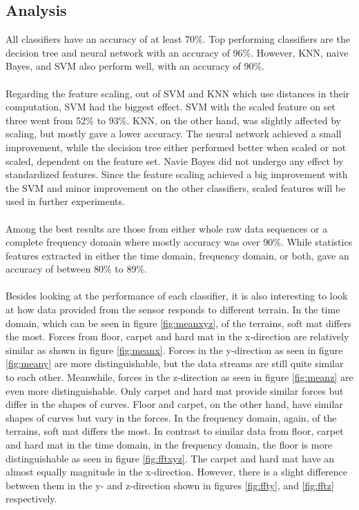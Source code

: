\documentclass[USenglish]{ifimaster}  %
\begin{document}
\subsection{Analysis}
All classifiers have an accuracy of at least 70\%. Top performing classifiers are the decision tree and neural network with an accuracy of 96\%. However, KNN, naive Bayes, and SVM also perform well, with an accuracy of 90\%. 
\\
\\
Regarding the feature scaling, out of SVM and KNN which use distances in their computation, SVM had the biggest effect. SVM with the scaled feature on set three went from 52\% to 93\%. KNN, on the other hand, was slightly affected by scaling, but mostly gave a lower accuracy. The neural network achieved a small improvement, while the decision tree either performed better when scaled or not scaled, dependent on the feature set. Navie Bayes did not undergo any effect by standardized features. Since the feature scaling achieved a big improvement with the SVM and minor improvement on the other classifiers, scaled features will be used in further experiments.
\\
\\
Among the best results are those from either whole raw data sequences or a complete frequency domain where mostly accuracy was over 90\%. While statistics features extracted in either the time domain, frequency domain, or both, gave an accuracy of between 80\% to 89\%.
\\
\\
Besides looking at the performance of each classifier, it is also interesting to look at how data provided from the sensor responds to different terrain. In the time domain, which can be seen in figure \ref{fig:meanxyz}, of the terrains, soft mat differs the most. Forces from floor, carpet and hard mat in the x-direction are relatively similar as shown in figure \ref{fig:meanx}. Forces in the y-direction as seen in figure \ref{fig:meany} are more distinguishable, but the data streams are still quite similar to each other. Meanwhile, forces in the z-direction as seen in figure \ref{fig:meanz} are even more distinguishable. Only carpet and hard mat provide similar forces but differ in the shapes of curves. Floor and carpet, on the other hand, have similar shapes of curves but vary in the forces. In the frequency domain, again, of the terrains, soft mat differs the most. In contrast to similar data from floor, carpet and hard mat in the time domain, in the frequency domain, the floor is more distinguishable as seen in figure \ref{fig:fftxyz}. The carpet and hard mat have an almost equally magnitude in the x-direction. However, there is a slight difference between them in the y- and z-direction shown in figures \ref{fig:ffty}, and \ref{fig:fftz} respectively.
\end{document}
